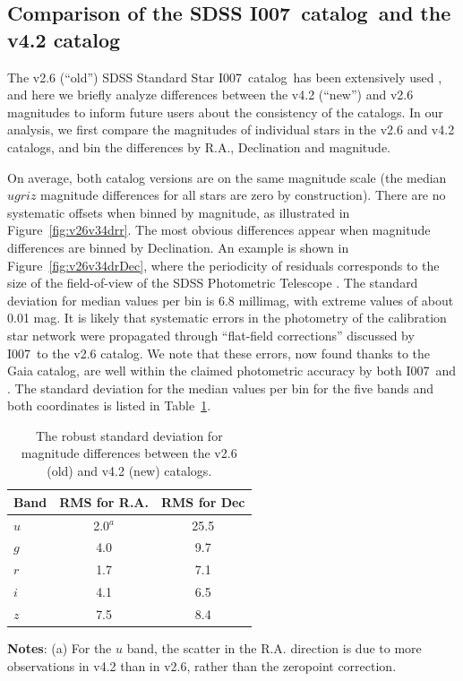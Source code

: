 \documentclass[fleqn,usenatbib]{mnras}
\newcommand{\pO}{\hbox{I007}}
\newcommand{\pOc}{\hbox{I007 catalog}}
\begin{document}

\subsection{Comparison of the SDSS \pOc\ and the v4.2 catalog \label{sec:v26v42}} 

The v2.6 (``old'') SDSS Standard Star \pOc\  has been extensively used 
\citep[e.g.,][]{2008AJ....135..338F},
and here we briefly analyze differences between the v4.2 (``new'') and v2.6 magnitudes
to inform future users about the consistency of the catalogs. 
In our analysis, we first compare the magnitudes of individual stars in the v2.6 and v4.2 catalogs, and 
bin the differences by R.A., Declination and magnitude. 

On average, both catalog versions are on the same magnitude scale (the median $ugriz$ 
magnitude differences for all stars are zero by construction). There are no systematic offsets 
when binned by magnitude, as illustrated in Figure~\ref{fig:v26v34drr}. The most obvious 
differences appear when magnitude differences are binned by Declination. An example is 
shown in Figure~\ref{fig:v26v34drDec}, where the periodicity of residuals corresponds to the 
size of the field-of-view of the SDSS Photometric Telescope \citep{2006AN....327..821T}. 
The standard deviation for median values per bin is 6.8 millimag, with extreme values of about 
0.01 mag. It is likely that systematic errors in the photometry of the calibration star network  
were propagated through ``flat-field corrections'' discussed by \pO\ to the v2.6 catalog.
We note that these errors, now found thanks to the Gaia catalog, are well within the claimed
photometric accuracy by both \pO\ and \cite{2002AJ....123.2121S}. The standard deviation 
for the median values per bin for the five bands and both coordinates is listed in Table~\ref{tab:oldnewRMS}. 
   
\begin{table}
	\centering
	\caption{The robust standard deviation for magnitude differences between the v2.6 (old) and v4.2 (new) catalogs.}
	\label{tab:oldnewRMS}
	\begin{tabular}{l|c|c} %
		\hline
		Band & RMS for R.A. & RMS for Dec \\
		\hline
        
       $u$        &        2.0$^a$    &    25.5      \\
       $g$        &        4.0    &      9.7      \\  
       $r$         &        1.7    &      7.1      \\  
       $i$         &        4.1    &      6.5      \\ 
       $z$        &        7.5    &      8.4      \\ 
		\hline
	\end{tabular}
     \vspace{1ex}

     {\raggedright {\bf Notes}: (a) For the $u$ band, the scatter in the R.A. direction is due to more observations in v4.2 than in v2.6, rather than the zeropoint correction. \par}
\end{table}
\end{document}
